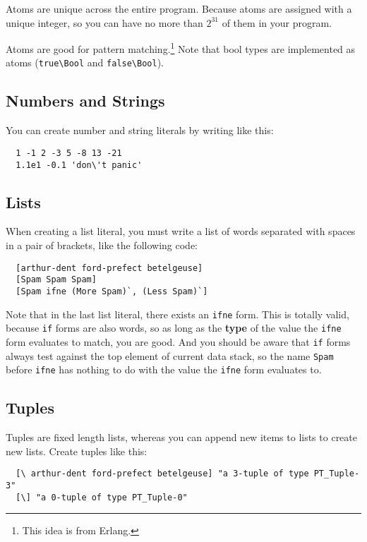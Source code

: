 \documentclass{book}
\begin{document}
Atoms are unique across the entire program. Because atoms are assigned with a unique integer, so you can have no more than $2^{31}$ of them in your program.


Atoms are good for pattern matching.\footnote{This idea is from Erlang.} Note that bool types are implemented as atoms (\texttt{true\textbackslash Bool} and \texttt{false\textbackslash Bool}).

\subsection{Numbers and Strings}

You can create number and string literals by writing like this:
\begin{verbatim}
  1 -1 2 -3 5 -8 13 -21
  1.1e1 -0.1 'don\'t panic'
\end{verbatim}

\subsection{Lists}

When creating a list literal, you must write a list of words separated with spaces in a pair of brackets, like the following code:
\begin{verbatim}
  [arthur-dent ford-prefect betelgeuse]
  [Spam Spam Spam]
  [Spam ifne (More Spam)`, (Less Spam)`]
\end{verbatim}

Note that in the last list literal, there exists an \texttt{ifne} form. This
is totally valid, because \texttt{if} forms are also words, so as long as the \textbf{type} of the value the \texttt{ifne} form evaluates to match, you are good. And you should be aware that \texttt{if} forms always test against the top element of current data stack, so the name \texttt{Spam} before \texttt{ifne} has nothing to do with the value the \texttt{ifne} form evaluates to.

\subsection{Tuples}

Tuples are fixed length lists, whereas you can append new items to lists to create new lists. Create tuples like this:
\begin{verbatim}
  [\ arthur-dent ford-prefect betelgeuse] "a 3-tuple of type PT_Tuple-3"
  [\] "a 0-tuple of type PT_Tuple-0"
\end{verbatim}
\end{document}

